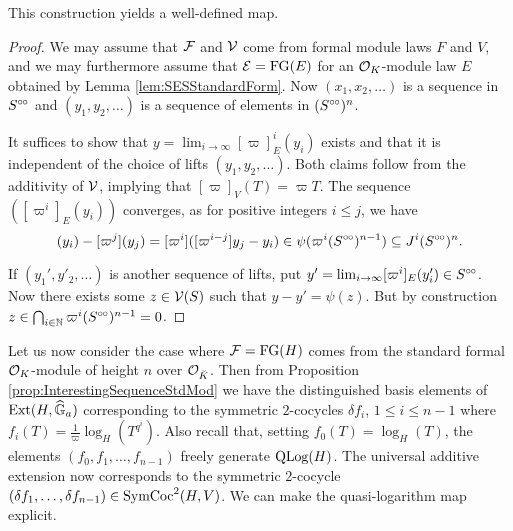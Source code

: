 \documentclass[../main.tex]{subfiles}
\begin{document}
\begin{prop}
  This construction yields a well-defined map. 
\begin{proof}
  We may assume that $\mathcal{F}$ and $\mathcal{V}$ come from formal module laws $F$ and 
  $V$, and we may furthermore assume that $\mathcal{E} = \textnormal{FG}(E)$ 
  for an $\mathcal{O}_K$-module law $E$ obtained by Lemma \ref{lem:SESStandardForm}. Now
  $(x_1, x_2, \dots)$ is a sequence in $S^{\circ \hspace{-0.5pt} \circ}$ and $(y_1, y_2, \dots)$ is a
  sequence of elements in $(S^{\circ \hspace{-0.5pt} \circ})^n$.

  It suffices to show that $y = \lim_{i\to \infty} [\varpi]^i_E(y_i)$ exists and 
  that it is independent of the choice of lifts $(y_1, y_2, \dots)$. 
  Both claims follow from the additivity of $\mathcal{V}$, implying that 
  $[\varpi]_{V}(T) = \varpi T$. The sequence 
  $([\varpi^i]_{E}(y_i))$ converges, as for positive integers $i\leq j$, we have 
  \begin{equation*}
    [\varpi^i](y_i) - [\varpi^j](y_j) = [\varpi^i]([\varpi^{i-j}]y_j - y_i)
    \in \psi(\varpi^i (S^\cici)^{n-1}) \subseteq J^i (S^\cici)^{n}. 
  \end{equation*}

  If $(y_1', y'_2, \dots)$ is another sequence of lifts, put
  $y' = \lim_{i \to \infty} [\varpi^i]_E (y_i') \in S^{\circ \hspace{-0.5pt} \circ}$. Now there exists some
  $z \in \mathcal{V}(S)$ such that 
  $y - y' = \psi(z)$. But by construction
  $z \in \bigcap_{i \in \mathbb{N}} \varpi^i(S^{{\circ \hspace{-0.5pt} \circ}})^{n-1} = 0$.
\end{proof}
\end{prop}

Let us now consider the case where $\mathcal{F} = \textnormal{FG}(H)$ comes from the standard
formal $\mathcal{O}_K$-module of height $n$ over $\mathcal{O}_{\breve K}$. Then 
from Proposition \ref{prop:InterestingSequenceStdMod} we have the distinguished
basis elements of $\operatorname{Ext}(H,\widehat{\mathbb{G}}_a)$ corresponding to the symmetric $2$-cocycles
$\delta f_i$, $1 \leq i \leq n-1$ where $f_i(T) = \frac 1 \varpi
\log_H(T^{q^i})$. Also recall that, setting $f_0(T) = \log_H(T)$, the elements 
$(f_0, f_1, \dots, f_{n-1})$ freely generate $\operatorname {QLog}(H)$. The universal
additive extension now corresponds to the symmetric $2$-cocycle $(\delta f_1,
\dots, \delta f_{n-1}) \in \operatorname{SymCoc}^2(H,V)$.
We can make the quasi-logarithm map explicit.
\end{document}
